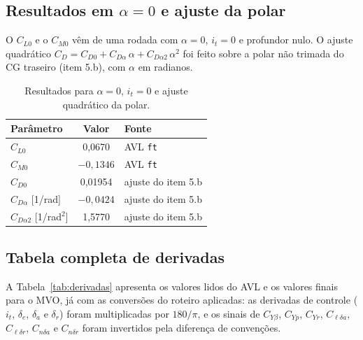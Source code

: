 \subsection*{Resultados em $\alpha = 0$ e ajuste da polar}

O $C_{L0}$ e o $C_{M0}$ vêm de uma rodada com $\alpha = 0$, $i_t = 0$ e
profundor nulo. O ajuste quadrático $C_D = C_{D0} + C_{D\alpha}\,\alpha +
C_{D\alpha 2}\,\alpha^2$ foi feito sobre a polar não trimada do CG
traseiro (item 5.b), com $\alpha$ em radianos.

\begin{table}[H]
\centering
\caption{Resultados para $\alpha = 0$, $i_t = 0$ e ajuste quadrático da polar.}\label{tab:cl0_polar}
\renewcommand{\arraystretch}{1.25}
\begin{tabular}{lcl}
\toprule
Parâmetro & Valor & Fonte \\
\midrule
$C_{L0}$ & 0,0670 & AVL \texttt{ft} \\
$C_{M0}$ & $-0{,}1346$ & AVL \texttt{ft} \\
$C_{D0}$ & 0,01954 & ajuste do item 5.b \\
$C_{D\alpha}$ [1/rad] & $-0{,}0424$ & ajuste do item 5.b \\
$C_{D\alpha 2}$ [1/rad$^2$] & 1,5770 & ajuste do item 5.b \\
\bottomrule
\end{tabular}
\end{table}

\subsection*{Tabela completa de derivadas}

A Tabela~\ref{tab:derivadas} apresenta os valores lidos do AVL e os
valores finais para o MVO, já com as conversões do roteiro aplicadas: as
derivadas de controle ($i_t$, $\delta_e$, $\delta_a$ e $\delta_r$) foram
multiplicadas por $180/\pi$, e os sinais de $C_{Y\beta}$, $C_{Yp}$,
$C_{Yr}$, $C_{\ell\delta a}$, $C_{\ell\delta r}$, $C_{n\delta a}$ e
$C_{n\delta r}$ foram invertidos pela diferença de convenções.

